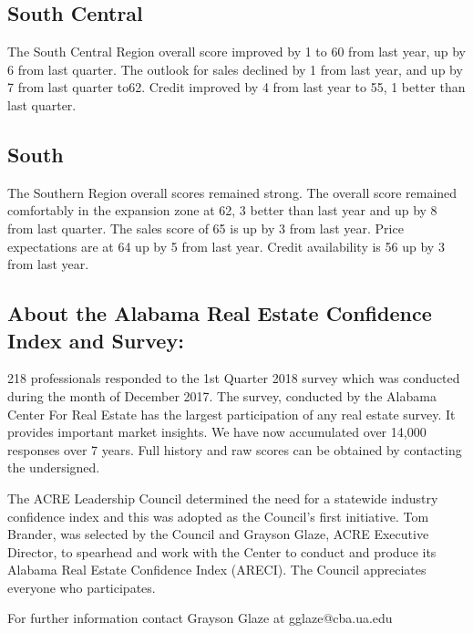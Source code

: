 \documentclass[11pt]{article}
\begin{document}
    \subsection{South Central}\label{south-central}

    The South Central Region overall score improved by 1 to 60 from last
year, up by 6 from last quarter. The outlook for sales declined by 1
from last year, and up by 7 from last quarter to62. Credit improved by 4
from last year to 55, 1 better than last quarter.

    \subsection{South}\label{south}

    The Southern Region overall scores remained strong. The overall score
remained comfortably in the expansion zone at 62, 3 better than last
year and up by 8 from last quarter. The sales score of 65 is up by 3
from last year. Price expectations are at 64 up by 5 from last year.
Credit availability is 56 up by 3 from last year.

    \subsection{About the Alabama Real Estate Confidence Index and
Survey:}\label{about-the-alabama-real-estate-confidence-index-and-survey}
218 professionals responded to the 1st Quarter 2018 survey which was conducted during the month of December 2017. The survey, conducted by the Alabama Center For Real Estate has the largest participation of any real estate survey. It provides important market insights. We have now accumulated over 14,000 responses over 7 years.  Full history and raw scores can be obtained by contacting the undersigned. \newline

The ACRE Leadership Council  determined the need for a statewide industry confidence index and this was adopted as the Council’s first initiative. Tom Brander, was selected by the Council and Grayson Glaze, ACRE Executive Director, to spearhead and work with the Center to conduct and produce its Alabama Real Estate Confidence Index (ARECI). The Council appreciates everyone who participates. \newline

For further information contact Grayson Glaze at gglaze@cba.ua.edu\iffalse
\end{document}
